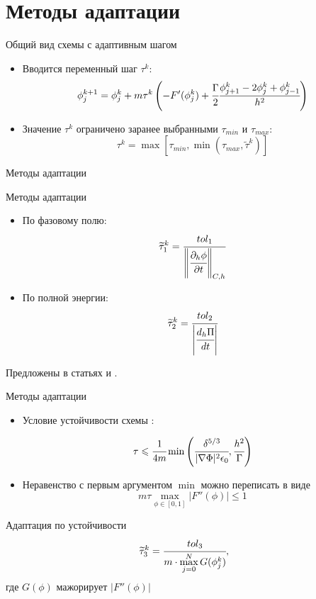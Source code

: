 
\section{Методы адаптации}

\begin{frame}{Общий вид схемы с адаптивным шагом}
\begin{itemize}
	\item Вводится переменный шаг $\tau^k$:
	\[
		\phi_j^{k + 1} = \phi_j^k + m \tau^k \left( -F'(\phi_j^k) + \cfrac{\Gamma}{2} \cfrac{{\phi}_{j + 1}^k - 2 {\phi}_j^k + {\phi}_{j - 1}^k}{h^2} \right)
	\]
	\item Значение $\tau^k$ ограничено заранее выбранными $\tau_{min}$ и $\tau_{max}$:
	\[
		\tau^k = \max \left[ \tau_{min}, \min( \tau_{max}, \widetilde{\tau}^k) \right]
	\]
\end{itemize}
\end{frame}


\begin{frame}{Методы адаптации}
\vspace{-0.7cm}
\begin{block}{Методы адаптации}
	\begin{itemize}
		\item По фазовому полю:
		\[
			\widetilde{\tau}_1^k = \cfrac{tol_1}{\left\|  \cfrac{\partial_h \phi}{\partial t} \right\|_{C, h}}
		\]
		\item По полной энергии:
		\[
			\widetilde{\tau}_2^k = \cfrac{tol_2}{\left| \cfrac{d_h \Pi}{dt} \right|}
		\]
	\end{itemize}
\end{block}
Предложены в статьях \cite{li_time_step} и \cite{zhang_time_step}.
\end{frame}

{\nologo
\begin{frame}{Методы адаптации}
\vspace{-0.6cm}
\begin{itemize}
	\item Условие устойчивости схемы \cite{ponomarev_stability}:
	\vspace{-0.3cm}

	\[
		\tau \leqslant \cfrac{1}{4m} \min \left( \cfrac{\delta^{5/3}}{|\nabla \Phi|^2 \epsilon_0}, \cfrac{h^2}{\Gamma} \right)
	\]
	\vspace{-0.3cm}
	\item Неравенство с первым аргументом $\min$ можно переписать в виде
	\[
		m \tau \max\limits_{\phi \in [0, 1]} |F''(\phi)| \leqslant 1
	\]
\end{itemize}
\vspace{-0.3cm}
\begin{block}{Адаптация по устойчивости}
	\[
		\widetilde{\tau}_3^k = \cfrac{tol_3}{m \cdot \max\limits_{j = 0}^N G(\phi_j^k)},
	\]
	где $G(\phi)$ мажорирует $|F''(\phi)|$
\end{block}
\end{frame}
}